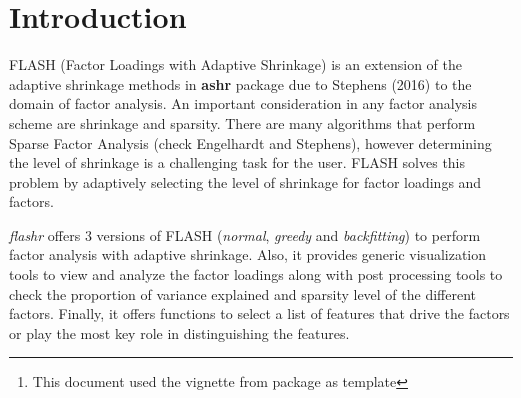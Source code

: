 \documentclass[12pt]{article}\usepackage[]{graphicx}\usepackage[usenames,dvipsnames]{color}
\author{Wei Wang, Kushal K Dey, David Gerrard \& Matthew Stephens \\[1em] \small{\textit{Stephens Lab}, The University of Chicago} \mbox{ }\\ \small{\texttt{$^*$Correspondending Email: mstephens@uchicago.edu}}}
\newcommand{\flashr}{\textit{flashr}}
\begin{document}
\maketitle

\begin{abstract}
  \vspace{1em}
  The \R{} package \flashr{} provides tools to perform factor analysis with adaptive shrinkage on the factor loadings and the factors and also provides means to visualization of the factor analysis results. The adaptive shrinkage is performed using the \textbf{ashr} package due to Stephens (2016).

  The package provides generic functions to visualize loadings data and post processing functions to analyze the factors estimated with focus on sparsity and the proportion of variance in the data explained by each factor. It also provides a list of features that play the key role in distinguishing the factors.

\vspace{1em}
\textbf{\flashr{} version:} 0.1.1 \footnote{This document used the vignette from \Bioconductor{} package  as  template}

\end{abstract}




\newpage

\tableofcontents

\section{Introduction}

FLASH (Factor Loadings with Adaptive Shrinkage) is an extension of the adaptive shrinkage methods in \textbf{ashr} package due to Stephens (2016) to the domain of factor analysis. An important consideration in any factor analysis scheme are shrinkage and sparsity. There are many algorithms that perform Sparse Factor Analysis (check Engelhardt and Stephens), however determining the level of shrinkage is a challenging task for the user. FLASH solves this problem by adaptively selecting the level of shrinkage for factor loadings and factors.

\flashr{} offers 3 versions of FLASH (\textit{normal}, \textit{greedy} and \textit{backfitting}) to perform factor analysis with adaptive shrinkage. Also, it provides generic visualization tools to view and analyze the factor loadings along with post processing tools to check the proportion of variance explained and sparsity level of the different factors. Finally, it offers functions to select a list of features that drive the factors or play the most key role in distinguishing the features.
\end{document}
